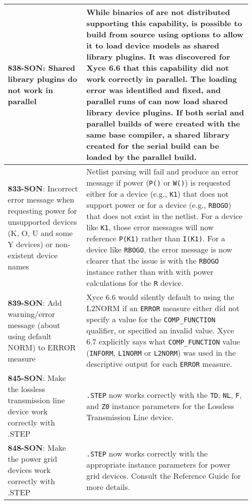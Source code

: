 {\begin{longtable}[h] {>{\raggedright\small}m{2in}|>{\raggedright\let\\\tabularnewline\small}m{3.5in}}
     \textbf{838-SON}: Shared library plugins do not work in parallel &
     While binaries of \Xyce{} are not distributed supporting this capability,
     is possible to build \Xyce{} from source using options to allow it to load
     device models as shared library plugins.  It was discovered for Xyce 6.6
     that this capability did not work correctly in parallel.  The loading
     error was identified and fixed, and parallel runs of \Xyce{} can now load
     shared library device plugins.  If both serial and parallel builds of
     \Xyce{} were created with the same base compiler, a shared library created
     for the serial build can be loaded by the parallel build. \\ \hline

    \textbf{833-SON}: Incorrect error message when requesting power for unsupported devices 
    (K, O, U and some Y devices) or non-existent device names &  Netlist parsing will fail 
    and produce an error message if power (\texttt{P()} or \texttt{W()}) is requested either
    for  a device (e.g., \texttt{K1}) that does not support power or for a device (e.g., 
    \texttt{RBOGO}) that does not exist in the netlist.  For a device like \texttt{K1}, those 
    error messages will now reference \texttt{P(K1)} rather than \texttt{I(K1)}. For a device 
    like \texttt{RBOGO}, the error message is now clearer that the issue is with the 
    \texttt{RBOGO} instance rather than with with power calculations for the \texttt{R} 
    device. \\ \hline     

     \textbf{839-SON}: Add warning/error message (about using default NORM) to ERROR 
     measure & Xyce 6.6 would silently default to using the L2NORM if an \texttt{ERROR}
     measure either did not specify a value for the \texttt{COMP\_FUNCTION} qualifier,
     or specified an invalid value. Xyce 6.7 explicitly says what \texttt{COMP\_FUNCTION} 
     value (\texttt{INFORM}, \texttt{L1NORM} or \texttt{L2NORM}) was used in the 
     descriptive output for each \texttt{ERROR} measure.  \\ \hline

     \textbf{845-SON}: Make the lossless transmission line device work correctly 
     with .STEP & \texttt{.STEP} now works correctly with the \texttt{TD}, \texttt{NL}, 
     \texttt{F}, and \texttt{Z0} instance parameters for the Lossless Transmission 
     Line device. \\ \hline 

     \textbf{848-SON}: Make the power grid devices work correctly with .STEP & 
     \texttt{.STEP} now works correctly with the appropriate instance parameters for 
     power grid devices. Consult the \Xyce{} Reference Guide for more details. \\ \hline 


\end{longtable}}

